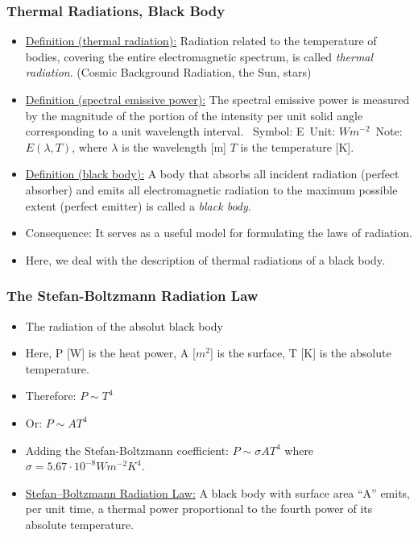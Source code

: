 \documentclass[t,aspectratio=169]{beamer}
\begin{document}

\begin{frame}%
\frametitle{Thermal Radiations, Black Body}
\begin{itemize}
\setlength{\parskip}{0pt}
\item \underline{Definition (thermal radiation):} Radiation related to the temperature of bodies, covering the entire electromagnetic spectrum, is called \textit{thermal radiation}. (Cosmic Background Radiation, the Sun, stars)
\item \underline{Definition (spectral emissive power):} The spectral emissive power is measured by the magnitude of the portion of the intensity per unit solid angle corresponding to a unit wavelength interval. \ Symbol: E\ Unit: $W m^{-2}$\ Note: $E\left(\lambda, T\right)$, where $\lambda$ is the wavelength [m] $T$ is the temperature [K]. 
\item \underline{Definition (black body):} A body that absorbs all incident radiation (perfect absorber) and emits all electromagnetic radiation to the maximum possible extent (perfect emitter) is called a \textit{black body}.
\item Consequence: It serves as a useful model for formulating the laws of radiation.
\item Here, we deal with the description of thermal radiations of a black body.
\end{itemize}
\end{frame}


\begin{frame}%
\frametitle{The Stefan-Boltzmann Radiation Law}
\begin{itemize}
\setlength{\parskip}{0pt}
\item The radiation of the absolut black body
\item Here, P [W] is the heat power, A [$m^{2}$] is the surface, T [K] is the absolute temperature.
\item Therefore: $P\sim T^{4}$
\item Or: $P\sim A T^{4}$
\item Adding the Stefan-Boltzmann coefficient:  $P\sim \sigma A T^{4}$ where $\sigma=5.67\cdot 10^{-8}Wm^{-2}K^{4}$.
\item \underline{Stefan–Boltzmann Radiation Law:} A black body with surface area ``A'' emits, per unit time, a thermal power proportional to the fourth power of its absolute temperature.
\end{itemize}
\end{frame}
\end{document}
